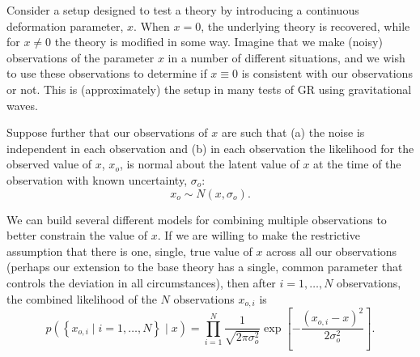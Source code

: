 \documentclass[modern]{aastex631}
\begin{document}
Consider a setup designed to test a theory by introducing a continuous
deformation parameter, $x$.  When $x=0$, the underlying theory is recovered,
while for $x \neq 0$ the theory is modified in some way.  Imagine that we make
(noisy) observations of the parameter $x$ in a number of different situations,
and we wish to use these observations to determine if $x\equiv 0$ is consistent
with our observations or not.  This is (approximately) the setup in many tests of GR using gravitational waves.  

Suppose further that our observations of $x$ are such that (a) the noise is
independent in each observation and (b) in each observation the likelihood for
the observed value of $x$, $x_o$, is normal about the latent value of $x$ at the
time of the observation with known uncertainty, $\sigma_o$:
\begin{equation}
    x_o \sim N\left(x, \sigma_o \right).
\end{equation}

We can build several different models for combining multiple observations to
better constrain the value of $x$.  If we are willing to make the restrictive
assumption that there is one, single, true value of $x$ across all our
observations (perhaps our extension to the base theory has a single, common
parameter that controls the deviation in all circumstances), then after $i = 1,
\ldots, N$ observations, the combined likelihood of the $N$ observations
$x_{o,i}$ is 
\begin{equation}
    \label{eq:fixed-x-likelihood}
    p\left( \left\{ x_{o,i} \mid i = 1, \ldots, N \right\} \mid x \right) = \prod_{i=1}^N \frac{1}{\sqrt{2 \pi \sigma_o^2}} \exp\left[-\frac{\left( x_{o,i} - x \right)^2}{2 \sigma_o^2} \right].
\end{equation}
\end{document}
